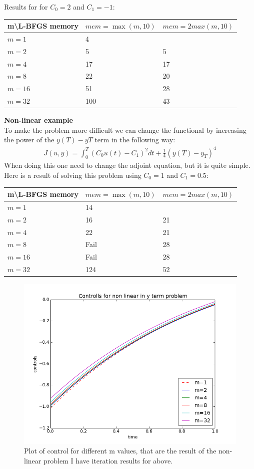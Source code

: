 \documentclass[11pt,a4paper]{report}
\begin{document}
Results for for $C_0=2 $ and $C_1= -1$:
\begin{center}
    \begin{tabular}{| l | l | l |}
    \hline
    m\textbackslash L-BFGS memory & $mem =\max(m,10)$& $mem=2max(m,10)$\\ \hline
    $m=1$  &  4 &  \\ \hline
    $m=2$  &  5 &  5	\\ \hline
    $m=4$ &  17 & 17 \\ \hline
    $m=8$ &  22 &  20	\\ \hline
    $m=16$ &  51 & 28 \\ \hline
    $m=32$ &  100 &  43	\\ \hline
    \end{tabular}
\end{center}
\textbf{Non-linear example}
\\
To make the problem more difficult we can change the functional by increasing the power of the $y(T)-yT$ term in the following way:
\begin{align*}
J(u,y) = \int_0^T (C_0u(t)-C_1)^2dt + \frac{1}{4}(y(T)-y_T)^4
\end{align*}
When doing this one need to change the adjoint equation, but it is quite simple. Here is a result of solving this problem using $C_0=1 $ and $C_1= 0.5$:
\begin{center}
    \begin{tabular}{| l | l | l |}
    \hline
    m\textbackslash L-BFGS memory & $mem =\max(m,10)$& $mem=2max(m,10)$\\ \hline
    $m=1$  &  14 &  \\ \hline
    $m=2$  &  16 & 21 	\\ \hline
    $m=4$ &  22 & 21 \\ \hline
    $m=8$ &  Fail &  28	\\ \hline
    $m=16$ &  Fail & 28 \\ \hline
    $m=32$ &  124 &  52	\\ \hline
    \end{tabular}
\end{center}
\begin{figure}
  \includegraphics[width=\linewidth]{non_linY.png}
  \caption{Plot of control for different m values, that are the result of the non-linear problem I have iteration results for above. }
  \label{Fig 4}
\end{figure}
\end{document}
